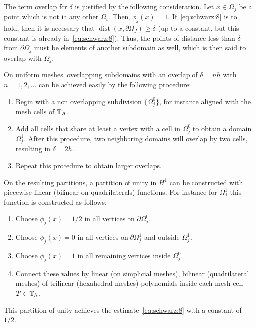 \begin{remark}
  The term overlap for $\delta$ is justified by the following
  consideration. Let $x \in \Omega_j$ be a point which is not in any
  other $\Omega_i$. Then, $\phi_j(x) = 1$. If~\eqref{eq:schwarz:8} is
  to hold, then it is necessary that
  $\operatorname{dist}(x,\partial\Omega_J) \ge \delta$ (up to a
  constant, but this constant is already
  in~\eqref{eq:schwarz:8}). Thus, the points of distance less than
  $\delta$ from $\partial\Omega_j$ must be elements of another
  subdomain as well, which is then said to overlap with $\Omega_j$.
\end{remark}

\begin{example}
  \label{example:schwarz:2}
  On uniform meshes, overlapping subdomains with an overlap of
  $\delta = n h$ with $n=1,2,\ldots$ can be achieved easily by the
  following procedure:
  \begin{enumerate}
  \item Begin with a non overlapping subdivision $\{\Omega_j^0\}$,
    for instance aligned with the mesh cells of $\mathbb T_H$.
  \item Add all cells that share at least a vertex with a cell in
    $\Omega_j^0$ to obtain a domain $\Omega_j^1$. After this
    procedure, two neighboring domains will overlap by two cells,
    resulting in $\delta = 2h$.
  \item Repeat this procedure to obtain larger overlaps.
  \end{enumerate}
  
  On the resulting partitions, a partition of unity in $H^1$ can be
  constructed with piecewise linear (bilinear on quadrilaterals)
  functions. For instance for $\Omega_j^1$ this function is
  constructed as follows:
  \begin{enumerate}
  \item Choose $\phi_j(x) = 1/2$ in all vertices on $\partial \Omega_j^0$.
  \item Choose $\phi_j(x) = 0$ in all vertices on $\partial \Omega_j^1$ and outside
    $\Omega_j^1$.
  \item Choose $\phi_j(x) = 1$ in all remaining vertices inside
    $\Omega_j^0$.
    \item Connect these values by linear (on simplicial meshes), bilinear
      (quadrilateral meshes) of trilinear (hexahedral meshes)
      polynomials inside each mesh cell $T\in \mathbb T_h$.
  \end{enumerate}
  This partition of unity achieves the estimate~\eqref{eq:schwarz:8}
  with a constant of $1/2$.
\end{example}

